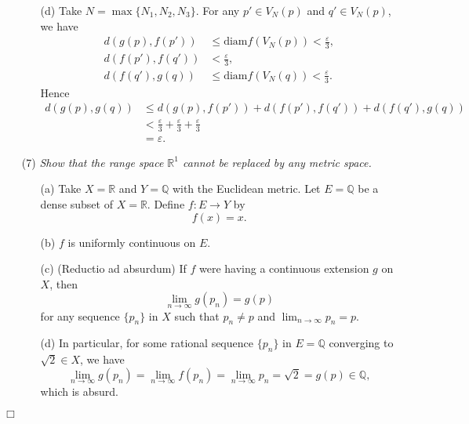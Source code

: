\documentclass{article}
\begin{document}
\begin{enumerate}
\begin{enumerate}
  \item[(d)]
  Take $N = \max\{N_1,N_2,N_3\}$.
  For any $p' \in V_N(p)$ and $q' \in V_N(p)$,
  we have
  \begin{align*}
    d(g(p),f(p')) &\leq \mathrm{diam} f(V_N(p)) < \frac{\varepsilon}{3}, \\
    d(f(p'),f(q')) &< \frac{\varepsilon}{3}, \\
    d(f(q'),g(q)) &\leq \mathrm{diam} f(V_N(q)) < \frac{\varepsilon}{3}.
  \end{align*}
  Hence
  \begin{align*}
    d(g(p),g(q))
    &\leq
    d(g(p),f(p')) + d(f(p'),f(q')) + d(f(q'),g(q)) \\
    &< \frac{\varepsilon}{3} + \frac{\varepsilon}{3} + \frac{\varepsilon}{3} \\
    &= \varepsilon.
  \end{align*}
  \end{enumerate}

\item[(7)]
\emph{Show that the range space $\mathbb{R}^1$ cannot be replaced by any metric space.}
  \begin{enumerate}
  \item[(a)]
  Take $X = \mathbb{R}$ and $Y = \mathbb{Q}$ with the Euclidean metric.
  Let $E = \mathbb{Q}$ be a dense subset of $X = \mathbb{R}$.
  Define $f: E \to Y$ by
  \[
    f(x) = x.
  \]

  \item[(b)]
  $f$ is uniformly continuous on $E$.

  \item[(c)]
  (Reductio ad absurdum)
  If $f$ were having a continuous extension $g$ on $X$,
  then
  \[
    \lim_{n \to \infty} g(p_n) = g(p)
  \]
  for any sequence $\{p_n\}$ in $X$ such that $p_n \neq p$ and $\lim_{n \to \infty} p_n = p$.

  \item[(d)]
  In particular, for some rational sequence $\{p_n\}$ in $E = \mathbb{Q}$
  converging to $\sqrt{2} \in X$, we have
  \[
    \lim_{n \to \infty} g(p_n)
    = \lim_{n \to \infty} f(p_n)
    = \lim_{n \to \infty} p_n
    = \sqrt{2} = g(p) \in \mathbb{Q},
  \]
  which is absurd.
  \end{enumerate}
\end{enumerate}
$\Box$ \\
\end{document}
